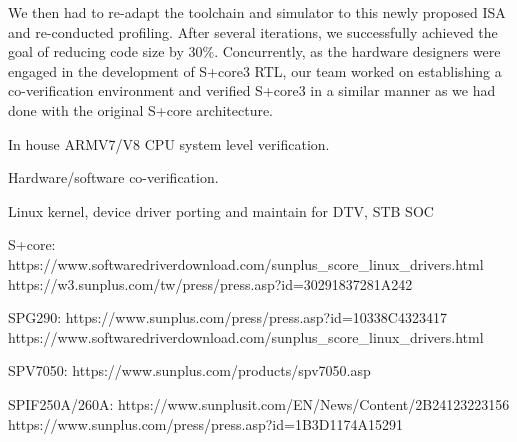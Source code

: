 We then had to re-adapt the toolchain and simulator to this newly proposed ISA and re-conducted profiling. After several iterations, we successfully achieved the goal of reducing code size by 30\%. Concurrently, as the hardware designers were engaged in the development of S+core3 RTL, our team worked on establishing a co-verification environment and verified S+core3 in a similar manner as we had done with the original S+core architecture.

In house ARMV7/V8 CPU system level verification.

Hardware/software co-verification.

Linux kernel, device driver porting and maintain for DTV, STB SOC


S+core:
https://www.softwaredriverdownload.com/sunplus_score_linux_drivers.html
https://w3.sunplus.com/tw/press/press.asp?id=30291837281A242



SPG290:
https://www.sunplus.com/press/press.asp?id=10338C4323417
https://www.softwaredriverdownload.com/sunplus_score_linux_drivers.html

SPV7050:
https://www.sunplus.com/products/spv7050.asp

SPIF250A/260A:
https://www.sunplusit.com/EN/News/Content/2B24123223156
https://www.sunplus.com/press/press.asp?id=1B3D1174A15291
